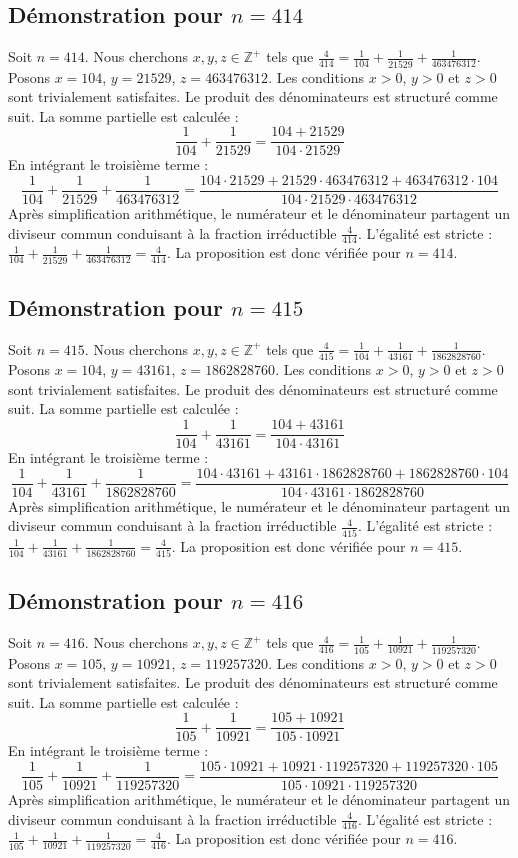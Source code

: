 \documentclass[11pt,a4paper]{article}
\begin{document}
\subsection{Démonstration pour $n = 414$}
Soit $n = 414$. Nous cherchons $x, y, z \in \mathbb{Z}^{+}$ tels que $\frac{4}{414} = \frac{1}{104} + \frac{1}{21529} + \frac{1}{463476312}$.
Posons $x = 104$, $y = 21529$, $z = 463476312$.
Les conditions $x > 0$, $y > 0$ et $z > 0$ sont trivialement satisfaites.
Le produit des dénominateurs est structuré comme suit. La somme partielle est calculée :
$$ \frac{1}{104} + \frac{1}{21529} = \frac{104+21529}{104 \cdot 21529} $$
En intégrant le troisième terme :
$$ \frac{1}{104} + \frac{1}{21529} + \frac{1}{463476312} = \frac{104 \cdot 21529 + 21529 \cdot 463476312 + 463476312 \cdot 104}{104 \cdot 21529 \cdot 463476312} $$
Après simplification arithmétique, le numérateur et le dénominateur partagent un diviseur commun conduisant à la fraction irréductible $\frac{4}{414}$.
L'égalité est stricte : $\frac{1}{104} + \frac{1}{21529} + \frac{1}{463476312} = \frac{4}{414}$.
La proposition est donc vérifiée pour $n = 414$.
\subsection{Démonstration pour $n = 415$}
Soit $n = 415$. Nous cherchons $x, y, z \in \mathbb{Z}^{+}$ tels que $\frac{4}{415} = \frac{1}{104} + \frac{1}{43161} + \frac{1}{1862828760}$.
Posons $x = 104$, $y = 43161$, $z = 1862828760$.
Les conditions $x > 0$, $y > 0$ et $z > 0$ sont trivialement satisfaites.
Le produit des dénominateurs est structuré comme suit. La somme partielle est calculée :
$$ \frac{1}{104} + \frac{1}{43161} = \frac{104+43161}{104 \cdot 43161} $$
En intégrant le troisième terme :
$$ \frac{1}{104} + \frac{1}{43161} + \frac{1}{1862828760} = \frac{104 \cdot 43161 + 43161 \cdot 1862828760 + 1862828760 \cdot 104}{104 \cdot 43161 \cdot 1862828760} $$
Après simplification arithmétique, le numérateur et le dénominateur partagent un diviseur commun conduisant à la fraction irréductible $\frac{4}{415}$.
L'égalité est stricte : $\frac{1}{104} + \frac{1}{43161} + \frac{1}{1862828760} = \frac{4}{415}$.
La proposition est donc vérifiée pour $n = 415$.
\subsection{Démonstration pour $n = 416$}
Soit $n = 416$. Nous cherchons $x, y, z \in \mathbb{Z}^{+}$ tels que $\frac{4}{416} = \frac{1}{105} + \frac{1}{10921} + \frac{1}{119257320}$.
Posons $x = 105$, $y = 10921$, $z = 119257320$.
Les conditions $x > 0$, $y > 0$ et $z > 0$ sont trivialement satisfaites.
Le produit des dénominateurs est structuré comme suit. La somme partielle est calculée :
$$ \frac{1}{105} + \frac{1}{10921} = \frac{105+10921}{105 \cdot 10921} $$
En intégrant le troisième terme :
$$ \frac{1}{105} + \frac{1}{10921} + \frac{1}{119257320} = \frac{105 \cdot 10921 + 10921 \cdot 119257320 + 119257320 \cdot 105}{105 \cdot 10921 \cdot 119257320} $$
Après simplification arithmétique, le numérateur et le dénominateur partagent un diviseur commun conduisant à la fraction irréductible $\frac{4}{416}$.
L'égalité est stricte : $\frac{1}{105} + \frac{1}{10921} + \frac{1}{119257320} = \frac{4}{416}$.
La proposition est donc vérifiée pour $n = 416$.
\end{document}

